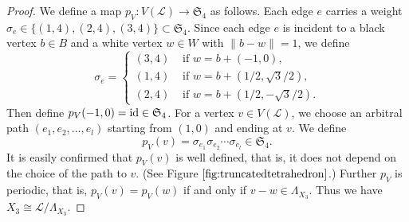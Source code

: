 \documentclass[lualatex,12pt]{article}
\begin{document}
\begin{proof}
We define a map $p_V:V({\mathcal L})\to {\mathfrak S}_4$ as follows.
Each edge $e$ carries a weight $\sigma_e\in \{(1, 4), (2, 4), (3, 4)\}\subset {\mathfrak S}_4$.
Since each edge $e$ is incident to a black vertex $b\in B$
and a white vertex $w\in W$ with $\|b-w\|=1$,
we define
\[
 \sigma_e = \begin{cases}
	(3, 4) & \mbox{ if } w = b + (-1,0),\\
	(1, 4) & \mbox{ if } w = b + (1/2,\sqrt{3}/2),\\
	(2, 4) & \mbox{ if } w = b + (1/2,-\sqrt{3}/2).
       \end{cases}
\]
Then define $p_V(-1,0) = {\rm id}\in {\mathfrak S}_4$.
For a vertex $v\in V({\mathcal L})$, we choose an
arbitral path $(e_1, e_2, \ldots, e_l)$ starting from $(1,0)$
and ending at $v$.
We define 
\[
 p_V(v) = \sigma_{e_1}\sigma_{e_2}\cdots \sigma_{e_l}\in {\mathfrak S}_4.
\]
It is easily confirmed that $p_V(v)$ is well defined,
that is, it does not depend on the choice of the path to $v$.
(See Figure $\ref{fig:truncatedtetrahedron}$.)
Further $p_V$ is periodic, that is,
$p_V(v)=p_V(w)$ if and only if
$
v-w \in \Lambda_{X_3}.
$
Thus we have $X_3\cong {\mathcal L}/\Lambda_{X_3}$.
 

\end{proof}
\end{document}
